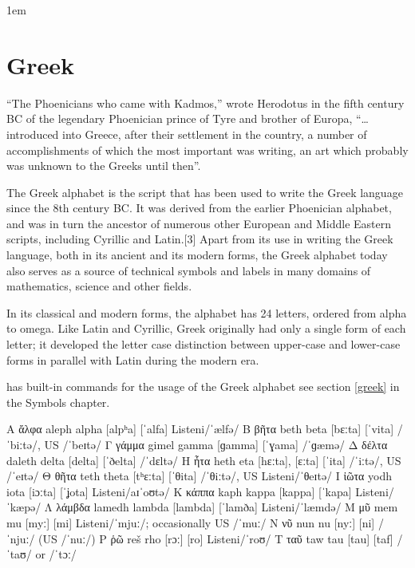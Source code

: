 

\parindent1em

\chapter{Greek}

``The Phoenicians who came with Kadmos,'' wrote Herodotus in the fifth century BC of the legendary Phoenician prince of Tyre and brother of Europa, ``\ldots introduced into Greece, after their settlement in the country, a number of accomplishments of which the most important was writing, an art which probably was unknown to the Greeks until then''. 

The Greek alphabet is the script that has been used to write the Greek language since the 8th century BC. It was derived from the earlier Phoenician alphabet, and was in turn the ancestor of numerous other European and Middle Eastern scripts, including Cyrillic and Latin.[3] Apart from its use in writing the Greek language, both in its ancient and its modern forms, the Greek alphabet today also serves as a source of technical symbols and labels in many domains of mathematics, science and other fields.

In its classical and modern forms, the alphabet has 24 letters, ordered from alpha to omega. Like Latin and Cyrillic, Greek originally had only a single form of each letter; it developed the letter case distinction between upper-case and lower-case forms in parallel with Latin during the modern era.

\tex has built-in commands for the usage of the Greek alphabet see section \ref{greek} in the Symbols chapter.

\bgroup
\obeylines
\greek\obeyspaces

Α	ἄλφα	aleph	alpha	[alpʰa]	[ˈalfa]	Listeni/ˈælfə/
Β	βῆτα	beth	beta	[bɛːta]	[ˈvita]	/ˈbiːtə/, US /ˈbeɪtə/
Γ	γάμμα	gimel	gamma	[ɡamma]	[ˈɣama]	/ˈɡæmə/
Δ	δέλτα	daleth	delta	[delta]	[ˈðelta]	/ˈdɛltə/
Η	ἦτα	  heth	   eta	 [hɛːta], [ɛːta]	[ˈita]	/ˈiːtə/, US /ˈeɪtə/
Θ	θῆτα	teth	theta	[tʰɛːta]	[ˈθita]	/ˈθiːtə/, US Listeni/ˈθeɪtə/
Ι	ἰῶτα	yodh	iota	[iɔːta]	[ˈʝota]	Listeni/aɪˈoʊtə/
Κ	κάππα	kaph	kappa	[kappa]	[ˈkapa]	Listeni/ˈkæpə/
Λ	λάμβδα	lamedh	lambda	[lambda]	[ˈlamða]	Listeni/ˈlæmdə/
Μ	μῦ	mem	mu	[myː]	[mi]	Listeni/ˈmjuː/; occasionally US /ˈmuː/
Ν	νῦ	nun	nu	[nyː]	[ni]	/ˈnjuː/ (US /ˈnuː/)
Ρ	ῥῶ	reš	rho	[rɔː]	[ro]	Listeni/ˈroʊ/
Τ	ταῦ	taw	tau	[tau]	[taf]	/ˈtaʊ/ or /ˈtɔː/
\egroup

